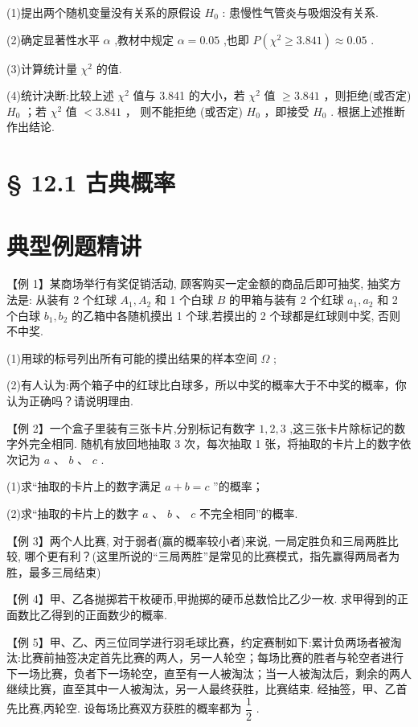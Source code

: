 (1)提出两个随机变量没有关系的原假设 ${H}_{0}$ : 患慢性气管炎与吸烟没有关系.

(2)确定显著性水平 $\alpha$ ,教材中规定 $\alpha  = {0.05}$ ,也即 $P\left( {{\chi }^{2} \geq  {3.841}}\right)  \approx  {0.05}$ .

(3)计算统计量 ${\chi }^{2}$ 的值.

(4)统计决断:比较上述 ${\chi }^{2}$ 值与 3.841 的大小，若 ${\chi }^{2}$ 值 $\geq  {3.841}$ ，则拒绝(或否定) ${H}_{0}$ ；若 ${\chi }^{2}$ 值 $< {3.841}$ ， 则不能拒绝 (或否定) ${H}_{0}$ ，即接受 ${H}_{0}$ . 根据上述推断作出结论.

\section*{§ 12.1 古典概率}

\section*{典型例题精讲}

【例 1】某商场举行有奖促销活动, 顾客购买一定金额的商品后即可抽奖, 抽奖方法是: 从装有 2 个红球 ${A}_{1},{A}_{2}$ 和 1 个白球 $B$ 的甲箱与装有 2 个红球 ${a}_{1},{a}_{2}$ 和 2 个白球 ${b}_{1},{b}_{2}$ 的乙箱中各随机摸出 1 个球,若摸出的 2 个球都是红球则中奖, 否则不中奖.

(1)用球的标号列出所有可能的摸出结果的样本空间 $\Omega$ ;

(2)有人认为:两个箱子中的红球比白球多，所以中奖的概率大于不中奖的概率，你认为正确吗？请说明理由.

【例 2】一个盒子里装有三张卡片,分别标记有数字 $1,2,3$ ,这三张卡片除标记的数字外完全相同. 随机有放回地抽取 3 次，每次抽取 1 张，将抽取的卡片上的数字依次记为 $a$ 、 $b$ 、 $c$ .

(1)求“抽取的卡片上的数字满足 $a + b = c$ ”的概率；

(2)求“抽取的卡片上的数字 $a$ 、 $b$ 、 $c$ 不完全相同”的概率.

【例 3】两个人比赛, 对于弱者(赢的概率较小者)来说, 一局定胜负和三局两胜比较, 哪个更有利？(这里所说的“三局两胜”是常见的比赛模式，指先赢得两局者为胜，最多三局结束)

【例 4】甲、乙各抛掷若干枚硬币,甲抛掷的硬币总数恰比乙少一枚. 求甲得到的正面数比乙得到的正面数少的概率.

【例 5】甲、乙、丙三位同学进行羽毛球比赛，约定赛制如下:累计负两场者被淘汰:比赛前抽签决定首先比赛的两人，另一人轮空；每场比赛的胜者与轮空者进行下一场比赛，负者下一场轮空，直至有一人被淘汰；当一人被淘汰后，剩余的两人继续比赛，直至其中一人被淘汰，另一人最终获胜，比赛结束. 经抽签，甲、乙首先比赛,丙轮空. 设每场比赛双方获胜的概率都为 $\dfrac{1}{2}$ .

